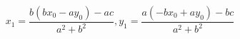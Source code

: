 \documentclass[12pt]{article}
\begin{document}
\[
    x_1 = \frac{b(bx_0 - ay_0) - ac}{a^2 + b^2}, y_1 = \frac{a(-bx_0 + ay_0) - bc}{a^2 + b^2} 
\]
\end{document}

